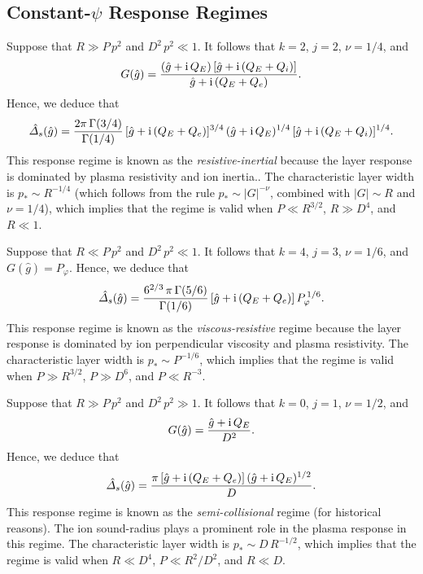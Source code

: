 \documentclass[12pt,prb,aps]{revtex4-1}
\begin{document}
\subsection{Constant-$\psi$ Response Regimes}\label{scp}
Suppose that $R\gg P\,p^2$ and $D^2\,p^2 \ll 1$. It follows that $k=2$, $j=2$, $\nu=1/4$, and
\begin{equation}
G(\hat{g}) = \frac{(\hat{g}+{\rm i}\,Q_E)\,[\hat{g}+{\rm i}\,(Q_E+Q_i)]}{\hat{g}+{\rm i}\,(Q_E+Q_e)}.
\end{equation}
Hence, we deduce that
\begin{equation}\label{ri}
\hat{\mit\Delta}_s(\hat{g}) = \frac{2\pi\,\Gamma(3/4)}{\Gamma(1/4)}\,[\hat{g}+{\rm i}\,(Q_E+Q_e)]^{3/4}\,(\hat{g}
+{\rm i}\,Q_E)^{1/4}\,[\hat{g}+{\rm i}\,(Q_E+Q_i)]^{1/4}.
\end{equation}
This response regime is known as the {\em resistive-inertial}\/  because the layer response is dominated by
plasma resistivity and ion inertia.\cite{fkr,err1a,ara}. The characteristic layer width is $p_\ast \sim R^{-1/4}$ (which follows from the rule $p_\ast\sim |G|^{-\nu}$,
combined with $|G|\sim R$ and $\nu=1/4$),
which implies that the regime is valid when $P\ll R^{3/2}$, $R\gg D^4$, and $R\ll 1$. 

Suppose that $R\ll P\,p^2$ and $D^2\,p^2\ll 1$. It follows that $k=4$, $j=3$, $\nu=1/6$, and $G(\hat{g})=P_\varphi$. 
Hence, we deduce that
\begin{equation}\label{vr}
\hat{\mit\Delta}_s(\hat{g}) = \frac{6^{2/3}\,\pi\,\Gamma(5/6)}{\Gamma(1/6)}\, [\hat{g}+{\rm i}\,(Q_E+Q_e)]\,P_\varphi^{\,1/6}.
\end{equation}
This response regime is known as the {\em viscous-resistive}\/ regime because the layer response is dominated by
  ion perpendicular viscosity and plasma resistivity.\cite{err1,bond} The characteristic layer width is $p_\ast \sim P^{-1/6}$, which implies that
the regime is valid when  $P\gg R^{3/2}$, $P\gg D^6$, and $P\ll R^{-3}$. 

Suppose that $R\gg P\,p^2$ and $D^2\,p^2\gg 1$. It follows that $k=0$, $j=1$, $\nu=1/2$, and
\begin{equation}
G(\hat{g}) = \frac{\hat{g}+ {\rm i}\,Q_E}{D^2}.
\end{equation}
Hence, we deduce that
\begin{equation}\label{sc}
\hat{\mit\Delta}_s(\hat{g})= \frac{\pi\,[\hat{g}+{\rm i}\,(Q_E+Q_e)]\,(\hat{g}+{\rm i}\,Q_E)^{1/2}}{D}.
\end{equation}
This response regime is known as the {\em semi-collisional}\/ regime (for historical reasons).\cite{drake,wal} The ion sound-radius plays a prominent role in the
plasma response in this regime. The characteristic
layer width is $p_\ast\sim D\,R^{-1/2}$, which implies that the regime is valid when $R\ll D^4$,
 $P\ll R^2/D^2$, and $R\ll D$. 
 
\end{document}

